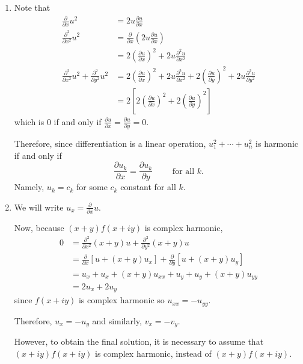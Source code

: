 \documentclass[12pt]{Homework}
\begin{document}
\begin{solution}$\,$
\begin{enumerate}[label=(\alph*)]
    \item Note that \begin{align*}
        \frac{\partial}{\partial x}u^2&=2u\frac{\partial u}{\partial x}\\
        \frac{\partial^2}{\partial x^2}u^2&=\frac{\partial}{\partial x}\left(2u\frac{\partial u}{\partial x}\right)\\
        &=2\left(\frac{\partial u}{\partial x}\right)^2+2u\frac{\partial^2 u}{\partial x^2}\\
         \frac{\partial^2}{\partial x^2}u^2+ \frac{\partial^2}{\partial y^2}u^2&=2\left(\frac{\partial u}{\partial x}\right)^2+2u\frac{\partial^2 u}{\partial x^2}+2\left(\frac{\partial u}{\partial y}\right)^2+2u\frac{\partial^2 u}{\partial y^2}\\
         &=2\left[2\left(\frac{\partial u}{\partial x}\right)^2+2\left(\frac{\partial u}{\partial y}\right)^2\right]
    \end{align*} which is $0$ if and only if $\frac{\partial u}{\partial x}=\frac{\partial u}{\partial y}=0$.
    
    Therefore, since differentiation is a linear operation, $u_1^2+\cdots+u_n^2$ is harmonic if and only if $$\frac{\partial u_k}{\partial x}=\frac{\partial u_k}{\partial y}\qquad\text{ for all }k.$$ Namely, $u_k=c_k$ for some $c_k$ constant for all $k.$
    
    \item We will write $u_x=\frac{\partial}{\partial x}u.$ 
    
     Now, because $(x+y)f(x+iy)$ is complex harmonic, \begin{align*}
        0&=\frac{\partial^2}{\partial x^2}(x+y)u+\frac{\partial^2}{\partial y^2}(x+y)u\\
        &=\frac{\partial}{\partial x}\left[u+(x+y)u_x\right]+\frac{\partial}{\partial y}\left[u+(x+y)u_y\right]\\
        &=u_x+u_x+(x+y)u_{xx}+u_y+u_y+(x+y)u_{yy}\\
        &=2u_x+2u_y
    \end{align*} since $f(x+iy)$ is complex harmonic so $u_{xx}=-u_{yy}.$
    
    Therefore, $u_x=-u_y$ and similarly, $v_x=-v_y$.
    
    However, to obtain the final solution, it is necessary to assume that $(x+iy)f(x+iy)$ is complex harmonic, instead of $(x+y)f(x+iy)$.
    

\end{enumerate}
\end{solution}
\end{document}
